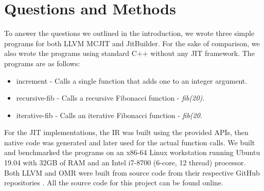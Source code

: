 \section{Questions and Methods}
\label{sec:methodology}
To answer the questions we outlined in the introduction, we wrote three simple programs for both LLVM MCJIT and JitBuilder.
For the sake of comparison, we also wrote the programs using standard C++ without any JIT framework.
The programs are as follows:
\begin{itemize}
    \item increment - Calls a single function that adds one to an integer argument.
    \item recursive-fib - Calls a recursive Fibonacci function - \textit{fib(20)}. 
    \item iterative-fib - Calls an iterative Fibonacci function - \textit{fib(20}.  
\end{itemize}
For the JIT implementations, the IR was built using the provided APIs, then native code was generated and later used for the actual function calls.
We built and benchmarked the programs on an x86-64 Linux workstation running Ubuntu 19.04 with 32GB of RAM and an Intel i7-8700 (6-core, 12 thread) processor. 
Both LLVM and OMR were built from source code from their respective GitHub repositories \cite{llvmCommit, omrCommit}.
All the source code for this project can be found online\cite{projectGithub}.